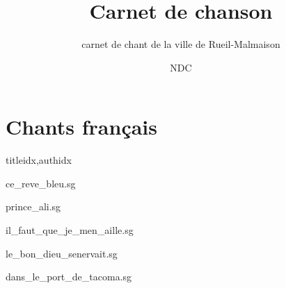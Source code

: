 \documentclass[
    ]{article}
\title{Carnet de chanson}
\author{NDC}
\subtitle{carnet de chant de la ville de Rueil-Malmaison}
\newcommand{\phantomsection}{}
\begin{document}
\maketitle



\ifdiagrampage
   \phantomsection
   \chords
\fi
\setcounter{songnum}{1}%

\phantomsection
{}


\section{Chants français}

\begin{songs}{titleidx,authidx}

{ce_reve_bleu.sg}


{prince_ali.sg}


{il_faut_que_je_men_aille.sg}


{le_bon_dieu_senervait.sg}


{dans_le_port_de_tacoma.sg}



\end{songs}
\end{document}
